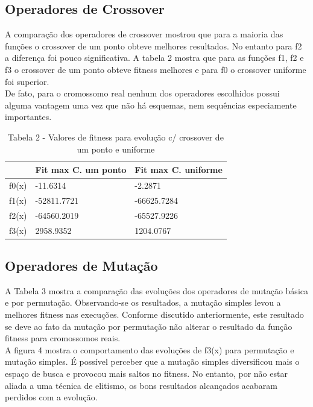 \documentclass[conference]{IEEEtran}
\begin{document}
\subsection{Operadores de Crossover}
A comparação dos operadores de crossover mostrou que para a maioria das funções 
o crossover de um ponto obteve melhores resultados. No entanto para f2 a diferença foi pouco
significativa. A tabela 2 mostra que para as funções f1, f2 e f3  o crossover de um ponto obteve fitness
melhores e para f0 o crossover uniforme foi superior. \\
De fato, para o cromossomo real nenhum dos operadores escolhidos possui alguma 
vantagem uma vez que não há esquemas, nem sequências especiamente importantes.\\

\begin{table}[]
\begin{tabular}{|l|l|l|}
\hline
      & Fit max C. um ponto & Fit max C. uniforme \\ \hline
f0(x) & -11.6314            & -2.2871             \\ \hline
f1(x) & -52811.7721         & -66625.7284         \\ \hline
f2(x) & -64560.2019         & -65527.9226         \\ \hline
f3(x) & 2958.9352           & 1204.0767           \\ \hline
\end{tabular}
\caption*{Tabela 2 - Valores de fitness para evolução c/ crossover de um ponto e uniforme}
\end{table}

\subsection{Operadores de Mutação}
A Tabela 3 mostra a comparação das evoluções dos operadores de mutação básica e
por permutação. Observando-se os resultados, a mutação simples levou 
a melhores fitness nas execuções. Conforme discutido anteriormente, este 
resultado se deve ao fato da mutação por permutação não alterar o resultado da 
função fitness para cromossomos reais.\\
A figura 4 mostra o comportamento das evoluções de f3(x) para permutação e mutação
simples. É possível perceber que a mutação simples diversificou mais o espaço de busca
e provocou mais saltos no fitness. No entanto, por não estar aliada a uma técnica de elitismo,
os bons resultados alcançados acabaram perdidos com a evolução.
\end{document}
